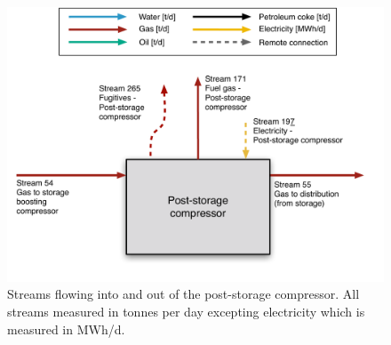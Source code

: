 \documentclass[11pt]{report}
\begin{document}
\begin{figure}
\includegraphics[width=0.85\columnwidth]{images/Post-storage_compressor_PF.pdf}
\caption{Streams flowing into and out of the post-storage compressor. All streams measured in tonnes per day excepting electricity which is measured in MWh/d.}
\label{fig:Post_storage_compressor_PF}
\end{figure}
\end{document}
